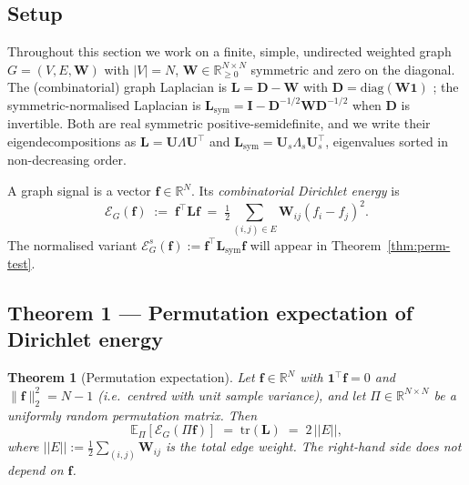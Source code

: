 \documentclass[11pt,a4paper]{article}
\newcommand{\E}{\mathbb{E}}
\newcommand{\tr}{\mathrm{tr}}
\newcommand{\1}{\mathbb{1}}
\newcommand{\bW}{\mathbf{W}}
\newcommand{\bD}{\mathbf{D}}
\newcommand{\bU}{\mathbf{U}}
\newcommand{\bI}{\mathbf{I}}
\newcommand{\bone}{\mathbf{1}}
\newcommand{\bff}{\mathbf{f}}
\newcommand{\Lsym}{\mathbf{L}_{\mathrm{sym}}}
\newcommand{\Lcomb}{\mathbf{L}}
\theoremstyle{plain}
\newtheorem{theorem}{Theorem}
\theoremstyle{definition}
\theoremstyle{remark}
\begin{document}
\subsection{Setup}

Throughout this section we work on a finite, simple, undirected
weighted graph $G = (V, E, \bW)$ with $|V| = N$, $\bW \in
\mathbb{R}^{N \times N}_{\geq 0}$ symmetric and zero on the
diagonal.  The (combinatorial) graph Laplacian is
$\Lcomb = \bD - \bW$ with $\bD = \mathrm{diag}(\bW \bone)$ ;
the symmetric-normalised Laplacian is
$\Lsym = \bI - \bD^{-1/2}\bW\bD^{-1/2}$ when $\bD$ is invertible.
Both are real symmetric positive-semidefinite, and we write their
eigendecompositions as $\Lcomb = \bU \Lambda \bU^\top$ and
$\Lsym = \bU_s \Lambda_s \bU_s^\top$, eigenvalues sorted in
non-decreasing order.

A graph signal is a vector $\bff \in \mathbb{R}^N$.  Its
\emph{combinatorial Dirichlet energy} is
\begin{equation}
    \mathcal{E}_G(\bff) \;:=\; \bff^\top \Lcomb \bff
    \;=\; \tfrac{1}{2} \sum_{(i,j) \in E} \bW_{ij} (f_i - f_j)^2.
    \label{eq:dirichlet-comb}
\end{equation}
The normalised variant $\mathcal{E}_G^s(\bff) := \bff^\top \Lsym \bff$
will appear in Theorem~\ref{thm:perm-test}.

\subsection{Theorem 1 — Permutation expectation of Dirichlet energy}

\begin{theorem}[Permutation expectation]
\label{thm:dirichlet}
Let $\bff \in \mathbb{R}^N$ with $\bone^\top \bff = 0$ and
$\|\bff\|_2^2 = N - 1$ (i.e.\ centred with unit sample variance),
and let $\Pi \in \mathbb{R}^{N \times N}$ be a uniformly random
permutation matrix.  Then
\begin{equation}
    \E_\Pi\!\left[ \mathcal{E}_G(\Pi \bff) \right]
    \;=\; \tr(\Lcomb)
    \;=\; 2 \, |\!| E |\!|,
    \label{eq:perm-energy-comb}
\end{equation}
where $|\!| E |\!| := \tfrac{1}{2} \sum_{(i,j)} \bW_{ij}$ is the
total edge weight.  The right-hand side does not depend on $\bff$.
\end{theorem}
\end{document}
